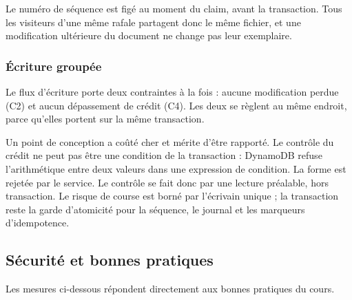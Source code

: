 
Le numéro de séquence est figé au moment du claim, avant la transaction. Tous
les visiteurs d'une même rafale partagent donc le même fichier, et une
modification ultérieure du document ne change pas leur exemplaire.

\subsubsection{Écriture groupée}

Le flux d'écriture porte deux contraintes à la fois : aucune modification perdue
(C2) et aucun dépassement de crédit (C4). Les deux se règlent au même endroit,
parce qu'elles portent sur la même transaction.


Un point de conception a coûté cher et mérite d'être rapporté. Le contrôle du
crédit ne peut pas être une condition de la transaction : DynamoDB refuse
l'arithmétique entre deux valeurs dans une expression de condition. La forme
 est rejetée par le service. Le contrôle se fait
donc par une lecture préalable, hors transaction. Le risque de course est borné
par l'écrivain unique ; la transaction reste la garde d'atomicité pour la
séquence, le journal et les marqueurs d'idempotence.

\subsection{Sécurité et bonnes pratiques}

Les mesures ci-dessous répondent directement aux bonnes pratiques du cours.

